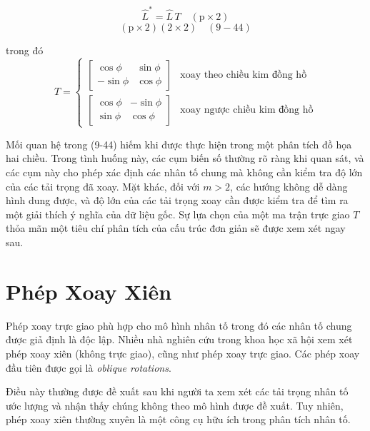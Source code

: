 \documentclass{article}
\begin{document}
\begin{equation}
\hat{L}^* = \hat{L} \, T \quad (\text{p} \times 2)
\end{equation}
\begin{equation}
\left( \text{p} \times 2 \right) \left( 2 \times 2 \right) \quad (9-44)
\end{equation}

trong đó
\[
T = 
\begin{cases}
    \begin{bmatrix}
        \cos \phi & \sin \phi \\
        -\sin \phi & \cos \phi
    \end{bmatrix} & \text{xoay theo chiều kim đồng hồ} \\
    \begin{bmatrix}
        \cos \phi & -\sin \phi \\
        \sin \phi & \cos \phi
    \end{bmatrix} & \text{xoay ngược chiều kim đồng hồ}
\end{cases}
\]

Mối quan hệ trong (9-44) hiếm khi được thực hiện trong một phân tích đồ họa hai chiều. Trong tình huống này, các cụm biến số thường rõ ràng khi quan sát, và các cụm này cho phép xác định các nhân tố chung mà không cần kiểm tra độ lớn của các tải trọng đã xoay. Mặt khác, đối với \( m > 2 \), các hướng không dễ dàng hình dung được, và độ lớn của các tải trọng xoay cần được kiểm tra để tìm ra một giải thích ý nghĩa của dữ liệu gốc. Sự lựa chọn của một ma trận trực giao \( T \) thỏa mãn một tiêu chí phân tích của cấu trúc đơn giản sẽ được xem xét ngay sau.
\section*{Phép Xoay Xiên}

Phép xoay trực giao phù hợp cho mô hình nhân tố trong đó các nhân tố chung được giả định là độc lập. Nhiều nhà nghiên cứu trong khoa học xã hội xem xét phép xoay xiên (không trực giao), cũng như phép xoay trực giao. Các phép xoay đầu tiên được gọi là \textit{oblique rotations}.

Điều này thường được đề xuất sau khi người ta xem xét các tải trọng nhân tố ước lượng và nhận thấy chúng không theo mô hình được đề xuất. Tuy nhiên, phép xoay xiên thường xuyên là một công cụ hữu ích trong phân tích nhân tố.
\end{document}
